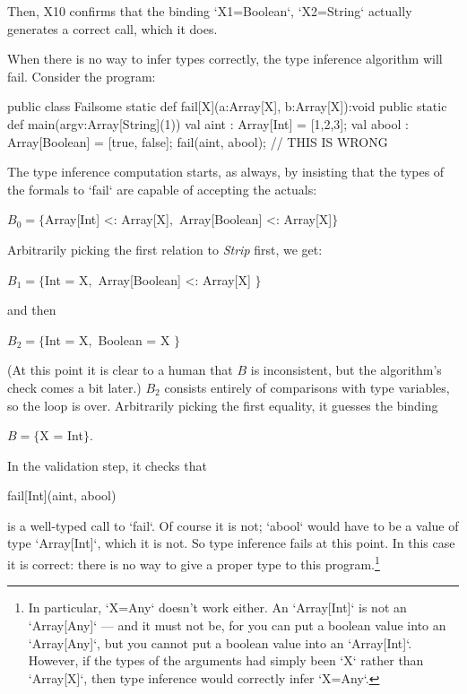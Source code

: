 {\begin{ex}
Then, X10 confirms that the binding \xcd`X1=Boolean`, \xcd`X2=String`
actually generates a correct call, which it does.  
\end{ex}


\begin{ex}
When there is no way to infer types correctly, the type inference algorithm
will fail.   Consider the program: 
\begin{xten}
public class Failsome {
  static def fail[X](a:Array[X], b:Array[X]):void {}
  public static def main(argv:Array[String](1)) {
    val aint  : Array[Int]     = [1,2,3];
    val abool : Array[Boolean] = [true, false];
    fail(aint, abool);    // THIS IS WRONG
  }
}
\end{xten}
The type inference computation starts, as always, by insisting that the types
of the formals to \xcd`fail` are capable of accepting the actuals: 
\begin{xtenmath}
$B_0=\{$Array[Int] <: Array[X]$,$ Array[Boolean] <: Array[X]$\}$
\end{xtenmath}
Arbitrarily picking the first relation to {\it Strip} first, we get:
\begin{xtenmath}
$B_1=\{$Int = X$,$ Array[Boolean] <: Array[X] $\}$
\end{xtenmath}
and then 
\begin{xtenmath}
$B_2=\{$Int = X$,$ Boolean = X $\}$
\end{xtenmath}
(At this point it is clear to a human that $B$ is inconsistent, but the
algorithm's check comes a bit later.)
{$B_2$} consists entirely of comparisons with type variables, so the loop is
over.  Arbitrarily picking the first equality, it guesses the binding 
\begin{xtenmath}
$B=\{$X = Int$\}$.
\end{xtenmath}
In the validation step, it checks that 
\begin{xtenmath}
fail[Int](aint, abool)
\end{xtenmath}
is a well-typed call to \xcd`fail`.  Of course it is not; \xcd`abool` would
have to be a value of type \xcd`Array[Int]`, which it is not.  So type
inference fails at this point.  In this case it is correct: there is no way to
give a proper type to this program.\footnote{
In particular, \xcd`X=Any` doesn't work either.  An \xcd`Array[Int]` is not an
\xcd`Array[Any]` --- and it must not be, for you can put a boolean value into
an \xcd`Array[Any]`, but you cannot put a boolean value into an
\xcd`Array[Int]`.  However, if the types of the arguments had simply been 
\xcd`X` rather than \xcd`Array[X]`, then type inference would correctly infer
\xcd`X=Any`.
}
\end{ex}

}
